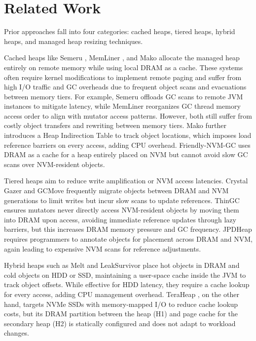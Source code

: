 \section{Related Work}
Prior approaches fall into four categories: cached heaps, tiered heaps, hybrid
heaps, and managed heap resizing techniques.

Cached heaps like Semeru \cite{semeru}, MemLiner \cite{memliner}, and Mako
\cite{mako} allocate the managed heap entirely on remote memory while using
local DRAM as a cache. These systems often require kernel modifications to
implement remote paging and suffer from high I/O traffic and GC overheads due to
frequent object scans and evacuations between memory tiers. For example, Semeru
offloads GC scans to remote JVM instances to mitigate latency, while MemLiner
reorganizes GC thread memory access order to align with mutator access patterns.
However, both still suffer from costly object transfers and rewriting between
memory tiers. Mako further introduces a Heap Indirection Table to track object
locations, which imposes load reference barriers on every access, adding CPU
overhead. Friendly-NVM-GC \cite{friendlynvmgc} uses DRAM as a cache for a heap
entirely placed on NVM but cannot avoid slow GC scans over NVM-resident objects.

Tiered heaps aim to reduce write amplification or NVM access latencies. Crystal
Gazer \cite{crystalgazer1, crystalgazer2} and GCMove \cite{gcmove} frequently
migrate objects between DRAM and NVM generations to limit writes but incur slow
scans to update references. ThinGC \cite{thingc} ensures mutators never directly
access NVM-resident objects by moving them into DRAM upon access, avoiding
immediate reference updates through lazy barriers, but this increases DRAM
memory pressure and GC frequency. JPDHeap \cite{jpdheap} requires programmers to
annotate objects for placement across DRAM and NVM, again leading to expensive
NVM scans for reference adjustments.

Hybrid heaps such as Melt \cite{melt} and LeakSurvivor \cite{leaksurvivor} place
hot objects in DRAM and cold objects on HDD or SSD, maintaining a user-space
cache inside the JVM to track object offsets. While effective for HDD latency,
they require a cache lookup for every access, adding CPU management overhead.
TeraHeap \cite{TeraHeap}, on the other hand, targets NVMe SSDs with
memory-mapped I/O to reduce cache lookup costs, but its DRAM partition between
the heap (H1) and page cache for the secondary heap (H2) is statically
configured and does not adapt to workload changes.

